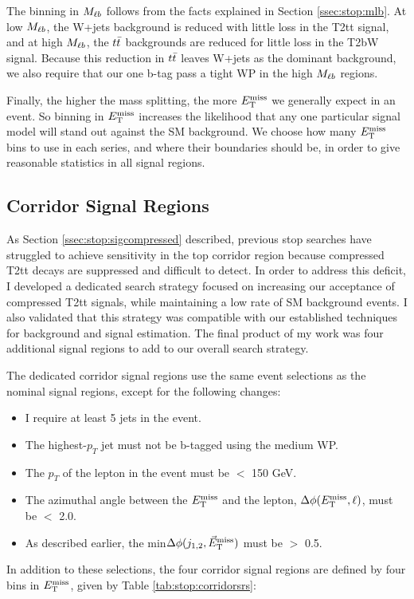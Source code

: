 The binning in $M_{\ell b}$ follows from the facts explained in
Section \ref{ssec:stop:mlb}. At low $M_{\ell b}$, the W+jets
background is reduced with little loss in the T2tt signal, and at high
$M_{\ell b}$, the $t\bar{t}$ backgrounds are reduced for little loss in
the T2bW signal. Because this reduction in $t\bar{t}$ leaves W+jets as
the dominant background, we also require that our one b-tag pass a
tight WP in the high $M_{\ell b}$ regions.

Finally, the higher the mass splitting, the more $E_\text{T}^\text{miss}$ we generally
expect in an event. So binning in $E_\text{T}^\text{miss}$ increases the
likelihood that any one particular signal model will stand out against the
SM background. We choose how many $E_\text{T}^\text{miss}$ bins to use in each series,
and where their boundaries should be, in order to give reasonable
statistics in all signal regions.

\subsection{Corridor Signal Regions}
\label{ssec:stop:sigregscorridor}

As Section \ref{ssec:stop:sigcompressed} described, previous stop
searches have struggled to achieve sensitivity in the top corridor
region because compressed T2tt decays are suppressed and difficult to
detect. In order to address this deficit, I developed a dedicated
search strategy focused on increasing our acceptance of compressed
T2tt signals, while maintaining a low rate of SM background
events. I also validated that this strategy was compatible with our
established techniques for background and signal estimation. The final
product of my work was four additional signal
regions to add to our overall search strategy.

The dedicated corridor signal regions use the same event selections as
the nominal signal regions, except for the following changes:
\begin{itemize}
\item I require at least 5 jets in the event.
\item The highest-$p_T$ jet must not be b-tagged using the medium WP.
\item The $p_T$ of the lepton in the event must be $<$ 150 GeV.
\item The azimuthal angle between the $E_\text{T}^\text{miss}$ and the lepton, $\Delta
  \phi (E_\text{T}^\text{miss}, \ell)$, must be $<$ 2.0.
\item As described earlier, the min$\Delta \phi(j_{1,2},\vec{E}_\text{T}^\text{miss})$
  must be $>$ 0.5.
\end{itemize}
In addition to these selections, the four corridor signal regions are
defined by four bins in $E_\text{T}^\text{miss}$, given by Table \ref{tab:stop:corridorsrs}:

